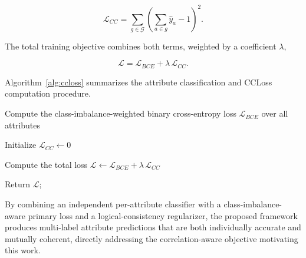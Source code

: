 \documentclass{ieeeaccess}
\begin{document}
\begin{equation}
\mathcal{L}_{CC}=\sum_{g\in\mathcal{G}}\left(\sum_{a\in g}\hat{y}_{a}-1\right)^{2}.
\label{eq:ccloss}
\end{equation}

The total training objective combines both terms, weighted by a coefficient $\lambda$,

\begin{equation}
\mathcal{L}=\mathcal{L}_{BCE}+\lambda\,\mathcal{L}_{CC}.
\label{eq:total_loss}
\end{equation}

Algorithm~\ref{alg:ccloss} summarizes the attribute classification and CCLoss computation procedure.
\begin{algorithm}[H]
\caption{Correlation Consistency Loss (CCLoss) and Attribute Classification}
\label{alg:ccloss}


Compute the class-imbalance-weighted binary cross-entropy loss $\mathcal{L}_{BCE}$ over all attributes\;

Initialize $\mathcal{L}_{CC}\leftarrow 0$\;


Compute the total loss $\mathcal{L}\leftarrow\mathcal{L}_{BCE}+\lambda\,\mathcal{L}_{CC}$\;

Return $\mathcal{L}$;

\end{algorithm}

By combining an independent per-attribute classifier with a class-imbalance-aware primary loss and a logical-consistency regularizer, the proposed framework produces multi-label attribute predictions that are both individually accurate and mutually coherent, directly addressing the correlation-aware objective motivating this work.
\end{document}
